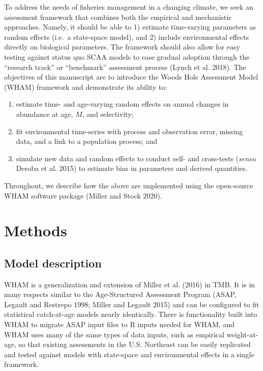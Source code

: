 \documentclass[]{article}
\providecommand{\tightlist}{%
  \setlength{\itemsep}{0pt}\setlength{\parskip}{0pt}}
\begin{document}
To address the needs of fisheries management in a changing climate, we
seek an assessment framework that combines both the empirical and
mechanistic approaches. Namely, it should be able to 1) estimate
time-varying parameters as random effects (i.e.~a state-space model),
and 2) include environmental effects directly on biological parameters.
The framework should also allow for easy testing against status quo SCAA
models to ease gradual adoption through the ``research track'' or
``benchmark'' assessment process (Lynch et al. 2018). The objectives of
this manuscript are to introduce the Woods Hole Assessment Model (WHAM)
framework and demonstrate its ability to:

\begin{enumerate}
\def\labelenumi{\arabic{enumi}.}
\tightlist
\item
  estimate time- and age-varying random effects on annual changes in
  abundance at age, \(M\), and selectivity;
\item
  fit environmental time-series with process and observation error,
  missing data, and a link to a population process; and
\item
  simulate new data and random effects to conduct self- and cross-tests
  (\emph{sensu} Deroba et al. 2015) to estimate bias in parameters and
  derived quantities.
\end{enumerate}

Throughout, we describe how the above are implemented using the
open-source WHAM software package (Miller and Stock 2020).

\hypertarget{methods}{%
\section{Methods}\label{methods}}

\hypertarget{model-description}{%
\subsection{Model description}\label{model-description}}

WHAM is a generalization and extension of Miller et al. (2016) in TMB.
It is in many respects similar to the Age-Structured Assessment Program
(ASAP, Legault and Restrepo 1998; Miller and Legault 2015) and can be
configured to fit statistical catch-at-age models nearly identically.
There is functionality built into WHAM to migrate ASAP input files to R
inputs needed for WHAM, and WHAM uses many of the same types of data
inputs, such as empirical weight-at-age, so that existing assessments in
the U.S. Northeast can be easily replicated and tested against models
with state-space and environmental effects in a single framework.
\end{document}
